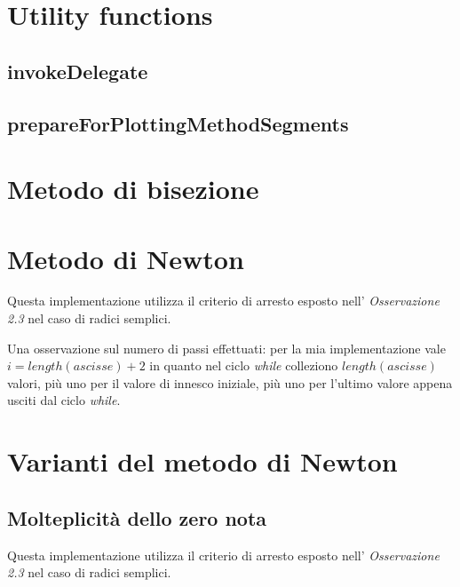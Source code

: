 \section{Utility functions}
\subsection{invokeDelegate}


\subsection{prepareForPlottingMethodSegments}


\section{Metodo di bisezione}
\label{sec:bisectionIterativeMethod}


\section{Metodo di Newton}
\label{sec:newtonIterativeMethod}
Questa implementazione utilizza il criterio di arresto esposto nell'
\emph{Osservazione 2.3} nel caso di radici semplici.

Una osservazione sul numero di passi effettuati: per la mia implementazione
vale $i = length(ascisse) + 2$ in quanto nel ciclo \emph{while} colleziono
$length(ascisse)$ valori, pi\`u uno per il valore di innesco iniziale, pi\`u uno
per l'ultimo valore appena usciti dal ciclo \emph{while}.


\section{Varianti del metodo di Newton}

\subsection{Molteplicit\`a dello zero nota}
\label{subsec:newtonMethodMultKnown}
Questa implementazione utilizza il criterio di arresto esposto nell'
\emph{Osservazione 2.3} nel caso di radici semplici.



